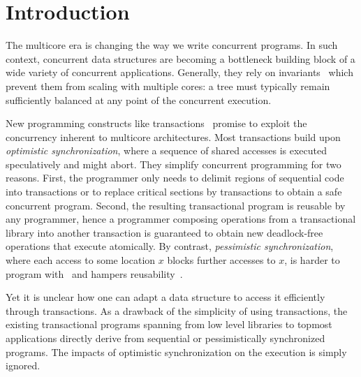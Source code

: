 \section{Introduction}

The multicore era is changing the way we write concurrent programs.
In such context, concurrent data structures are becoming a bottleneck building 
block of a wide variety of concurrent applications.
Generally, they rely on invariants~\cite{Sha2011} which prevent them from scaling with multiple cores: 
a tree must typically remain sufficiently balanced at any point of the concurrent execution.

New programming constructs like transactions~\cite{HM93,ST95} promise 
to exploit the concurrency inherent to multicore architectures.
Most transactions build upon \emph{optimistic synchronization}, 
where a sequence of shared accesses is executed speculatively and might abort.
They simplify concurrent programming for two reasons.
First, the programmer only needs to delimit regions of sequential 
code into transactions or to replace critical sections by transactions
to obtain a safe concurrent program.
Second, the resulting transactional program is reusable by any programmer, 
hence a programmer composing operations from a transactional library into another 
transaction is guaranteed to obtain new deadlock-free operations that execute atomically.
By contrast, \emph{pessimistic synchronization}, where each access to some 
location $x$ blocks further accesses to $x$,
is harder to program with~\cite{PA11,RHW10} and hampers reusability~\cite{HMPH05,GG11}.

Yet it is unclear how one can adapt a data structure to 
access it efficiently through transactions.
As a drawback of the simplicity of using transactions, 
the existing transactional programs spanning from low level libraries to 
topmost applications directly derive from sequential or pessimistically synchronized programs.
The impacts of optimistic synchronization on the execution is simply ignored. 

